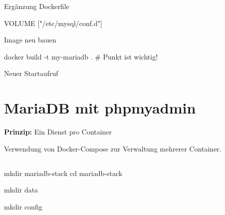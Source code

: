 \documentclass[
  ngerman,
  letterpaper,
  DIV=11]{scrreprt}
\newenvironment{Shaded}{\begin{snugshade}}{\end{snugshade}}
\newcommand{\AttributeTok}[1]{\textcolor[rgb]{0.40,0.45,0.13}{#1}}
\newcommand{\BuiltInTok}[1]{\textcolor[rgb]{0.00,0.23,0.31}{#1}}
\newcommand{\CommentTok}[1]{\textcolor[rgb]{0.37,0.37,0.37}{#1}}
\newcommand{\DataTypeTok}[1]{\textcolor[rgb]{0.68,0.00,0.00}{#1}}
\newcommand{\ExtensionTok}[1]{\textcolor[rgb]{0.00,0.23,0.31}{#1}}
\newcommand{\NormalTok}[1]{\textcolor[rgb]{0.00,0.23,0.31}{#1}}
\newcommand{\PreprocessorTok}[1]{\textcolor[rgb]{0.68,0.00,0.00}{#1}}
\newcommand{\StringTok}[1]{\textcolor[rgb]{0.13,0.47,0.30}{#1}}
\newcommand{\VariableTok}[1]{\textcolor[rgb]{0.07,0.07,0.07}{#1}}
\begin{document}
Ergänzung Dockerfile

\begin{Shaded}
\begin{Highlighting}[]
\ExtensionTok{VOLUME} \PreprocessorTok{[}\StringTok{"/etc/mysql/conf.d"}\PreprocessorTok{]}
\end{Highlighting}
\end{Shaded}

Image neu bauen

\begin{Shaded}
\begin{Highlighting}[]
\ExtensionTok{docker}\NormalTok{ build }\AttributeTok{{-}t}\NormalTok{ my{-}mariadb .   }\CommentTok{\# Punkt ist wichtig!}
\end{Highlighting}
\end{Shaded}

Neuer Startaufruf

\begin{Shaded}
\end{Shaded}

\section{MariaDB mit phpmyadmin}\label{mariadb-mit-phpmyadmin}

\textbf{Prinzip:} Ein Dienst pro Container

Verwendung von Docker-Compose zur Verwaltung mehrerer Container.

\subsection{}\label{section}

mkdir mariadb-stack cd mariadb-stack

mkdir data

mkdir config
\end{document}
